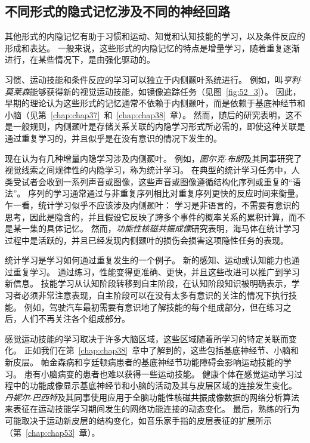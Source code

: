 \subsection{不同形式的隐式记忆涉及不同的神经回路}

其他形式的内隐记忆有助于习惯和运动、知觉和认知技能的学习，以及条件反应的形成和表达。
一般来说，这些形式的内隐记忆的特点是增量学习，随着重复逐渐进行，在某些情况下，是由强化驱动的。


习惯、运动技能和条件反应的学习可以独立于内侧颞叶系统进行。
例如，叫\textit{亨利$\cdot$莫莱森}能够获得新的视觉运动技能，如镜像追踪任务（见图~\ref{fig:52_3}）。
因此，早期的理论认为这些形式的记忆通常不依赖于内侧颞叶，而是依赖于基底神经节和小脑（见第~\ref{chap:chap37}~和~\ref{chap:chap38}~章）。
然而，随后的研究表明，这不是一般规则，内侧颞叶是存储关系关联的内隐学习形式所必需的，即使这种关联是通过重复学习的，并且似乎是在没有意识的情况下发生的。


现在认为有几种增量内隐学习涉及内侧颞叶。
例如，\textit{图尔克$\cdot$布朗}及其同事研究了视觉线索之间规律性的内隐学习，称为统计学习。
在典型的统计学习任务中，人类受试者会收到一系列声音或图像，这些声音或图像遵循结构化序列或重复的“语法”。
序列的学习通常通过与非重复序列相比对重复序列更快的反应时间来衡量。
乍一看，统计学习似乎不应该涉及内侧颞叶：
学习是非语言的，不需要有意识的思考，因此是隐含的，并且假设它反映了跨多个事件的概率关系的累积计算，而不是某一集的具体记忆。
然而，\textit{功能性核磁共振成像}研究表明，海马体在统计学习过程中是活跃的，并且已经发现内侧颞叶的损伤会损害这项隐性任务的表现。


统计学习是学习如何通过重复发生的一个例子。
新的感知、运动或认知能力也通过重复学习。
通过练习，性能变得更准确、更快，并且这些改进可以推广到学习新信息。
技能学习从认知阶段转移到自主阶段，在认知阶段知识被明确表示，学习者必须非常注意表现，自主阶段可以在没有太多有意识的关注的情况下执行技能。
例如，驾驶汽车最初需要有意识地了解技能的每个组成部分，但在练习之后，人们不再关注各个组成部分。


感觉运动技能的学习取决于许多大脑区域，这些区域随着所学习的特定关联而变化。
正如我们在第~\ref{chap:chap38}~章中了解到的，这些包括基底神经节、小脑和新皮层。
帕金森病和亨廷顿病患者的基底神经节功能障碍会影响运动技能的学习。
患有小脑病变的患者也难以获得一些运动技能。
健康个体在感觉运动学习过程中的功能成像显示基底神经节和小脑的活动及其与皮层区域的连接发生变化。
\textit{丹妮尔$\cdot$巴西特}及其同事使用应用于全脑功能性核磁共振成像数据的网络分析算法来表征在运动技能学习期间发生的网络功能连接的动态变化。
最后，熟练的行为可能取决于运动新皮层的结构变化，如音乐家手指的皮层表征的扩展所示（第~\ref{chap:chap53}~章）。


